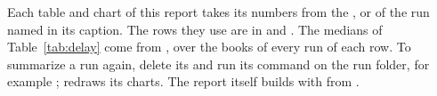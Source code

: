 Each table and chart of this report takes its numbers from the ,  or
 of the run named in its caption. The rows they use are in  and
. The medians of Table~\ref{tab:delay} come from , over the books of
every run of each row. To summarize a run again, delete its  and run its  command on the
run folder, for example ;
 redraws its charts. The report itself builds with
 from .
